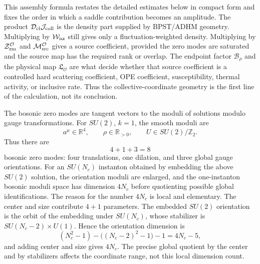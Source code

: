 \begin{controlledapproximation}
This assembly formula restates the detailed estimates below in compact form
and fixes the order in which a saddle contribution becomes an amplitude.  The
product
\(\mathcal D_{\rm cl}\mathcal J_{\rm coll}\) is the density part supplied by
BPST/ADHM geometry.  Multiplying by
\(\mathcal W_{\rm nz}\) still gives only a fluctuation-weighted density.
Multiplying by \(\mathcal Z_{\rm zm}^{\mathcal O}\) and
\(\mathcal M_{\rm src}^{\mathcal O}\) gives a source coefficient, provided
the zero modes are saturated and the source map has the required rank or
overlap.  The endpoint factor \(\mathcal B_\rho\) and the physical map
\(\mathfrak L_{\mathcal O}\) are what decide whether that source coefficient
is a controlled hard scattering coefficient, OPE coefficient, susceptibility,
thermal activity, or inclusive rate.  Thus the collective-coordinate geometry
is the first line of the calculation, not its conclusion.
\end{controlledapproximation}

The bosonic zero modes are tangent vectors to the moduli of solutions modulo
gauge transformations.  For \(SU(2)\), \(k=1\), the smooth moduli are
\[
  a^\mu\in\mathbb R^4,\qquad
  \rho\in\mathbb R_{>0},\qquad
  U\in SU(2)/\mathbb Z_2 .
\]
Thus there are
\[
  4+1+3=8
\]
bosonic zero modes: four translations, one dilation, and three global gauge
orientations.  For an \(SU(N_c)\) instanton obtained by embedding the above
\(SU(2)\) solution, the orientation moduli are enlarged, and the
one-instanton bosonic moduli space has dimension \(4N_c\) before quotienting
possible global identifications.  The reason for the number \(4N_c\) is
local and elementary.  The center and size contribute \(4+1\) parameters.  The
embedded \(SU(2)\) orientation is the orbit of the embedding under
\(SU(N_c)\), whose stabilizer is \(SU(N_c-2)\times U(1)\).  Hence the
orientation dimension is
\[
  (N_c^2-1)-\bigl((N_c-2)^2-1\bigr)-1=4N_c-5 ,
\]
and adding center and size gives \(4N_c\).  The precise global quotient by
the center and by stabilizers affects the coordinate range, not this local
dimension count.

